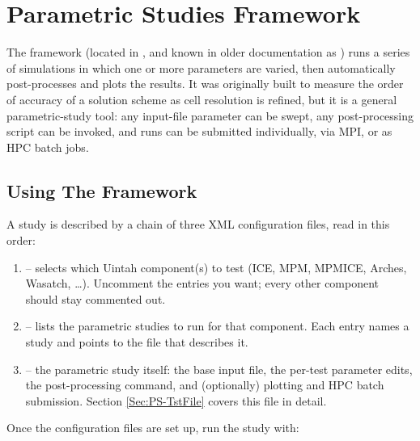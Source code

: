 \chapter{Parametric Studies Framework}
\label{chap:OA}

\begingroup
\setlength{\parindent}{0pt}
\setlength{\parskip}{0.5\baselineskip}

The  framework (located in , and known in older
documentation as ) runs a series of simulations in which one or more parameters
are varied, then automatically post-processes and plots the results. It was originally built to
measure the order of accuracy of a solution scheme as cell resolution is refined, but it is a
general parametric-study tool: any input-file parameter can be swept, any post-processing script can
be invoked, and runs can be submitted individually, via MPI, or as HPC batch jobs.

\section{Using The Framework}
\label{Sec:PS-UsingFramework}

A study is described by a chain of three XML configuration files, read in this order:

\begin{enumerate}
\item {} -- selects which Uintah component(s) to test (ICE,
  MPM, MPMICE, Arches, Wasatch, \ldots). Uncomment the  entries you want;
  every other component should stay commented out.
\item {} -- lists the parametric studies to
  run for that component. Each  entry names a study and points to the 
  file that describes it.
\item {} -- the parametric study itself:
  the base input file, the per-test parameter edits, the post-processing command, and
  (optionally) plotting and HPC batch submission. Section \ref{Sec:PS-TstFile} covers this file
  in detail.
\end{enumerate}

Once the configuration files are set up, run the study with:


